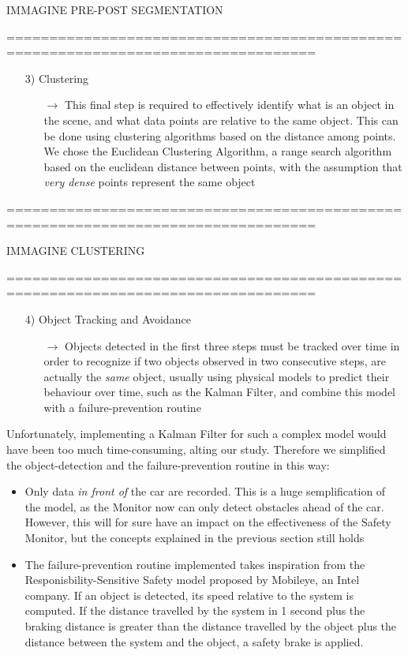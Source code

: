 IMMAGINE PRE-POST SEGMENTATION

==================================================================================

\begin{itemize}
	\item[3)] Clustering
	\begin{itemize}
		\item[$\rightarrow$] This final step is required to effectively identify what is an object in the scene, and what data points are relative to the same object. This can be done using clustering algorithms based on the distance among points. We chose the Euclidean Clustering Algorithm, a range search algorithm based on the euclidean distance between points, with the assumption that \textsl{very dense} points represent the same object
	\end{itemize}
\end{itemize}


==================================================================================

IMMAGINE CLUSTERING

==================================================================================

\begin{itemize}
	\item[4)] Object Tracking and Avoidance
	\begin{itemize}
		\item[$\rightarrow$] Objects detected in the first three steps must be tracked over time in order to recognize if two objects observed in two consecutive steps, are actually the \textsl{same} object, usually using physical models to predict their behaviour over time, such as the Kalman Filter, and combine this model with a failure-prevention routine
	\end{itemize}
\end{itemize}

Unfortunately, implementing a Kalman Filter for such a complex model would have been too much time-consuming, alting our study. Therefore we simplified the object-detection and the failure-prevention routine in this way:

\begin{itemize}
	\item Only data \textsl{in front of} the car are recorded. This is a huge semplification of the model, as the Monitor now can only detect obstacles ahead of the car. However, this will for sure have an impact on the effectiveness of the Safety Monitor, but the concepts explained in the previous section still holds
	\item The failure-prevention routine implemented takes inspiration from the Responisbility-Sensitive Safety model proposed by Mobileye, an Intel company.\cite{rss}
	If an object is detected, its speed relative to the system is computed. If the distance travelled by the system in 1 second  plus the braking distance is greater than the distance travelled by the object plus the distance between the system and the object, a safety brake is applied.
\end{itemize}

